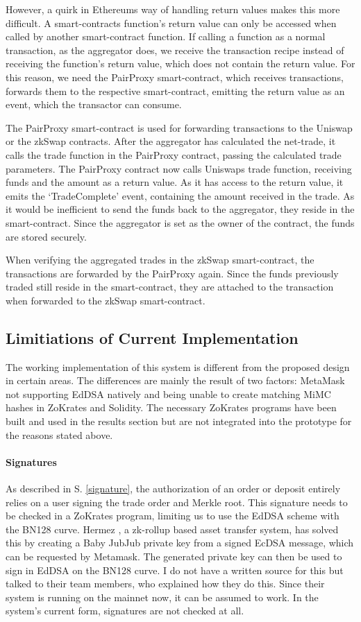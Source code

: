 \documentclass[../../thesis.tex]{subfiles}
\begin{document}
However, a quirk in Ethereums way of handling return values makes this more difficult. A smart-contracts function's return value can only be accessed when called by another smart-contract function. If calling a function as a normal transaction, as the aggregator does, we receive the transaction recipe instead of receiving the function's return value, which does not contain the return value. For this reason, we need the PairProxy smart-contract, which receives transactions, forwards them to the respective smart-contract, emitting the return value as an event, which the transactor can consume. 

The PairProxy smart-contract is used for forwarding transactions to the Uniswap or the zkSwap contracts. After the aggregator has calculated the net-trade, it calls the trade function in the PairProxy contract, passing the calculated trade parameters. The PairProxy contract now calls Uniswaps trade function, receiving funds and the amount as a return value. As it has access to the return value, it emits the `TradeComplete' event, containing the amount received in the trade. As it would be inefficient to send the funds back to the aggregator, they reside in the smart-contract. Since the aggregator is set as the owner of the contract, the funds are stored securely.

When verifying the aggregated trades in the zkSwap smart-contract, the transactions are forwarded by the PairProxy again. Since the funds previously traded still reside in the smart-contract, they are attached to the transaction when forwarded to the zkSwap smart-contract.

\subsection{Limitiations of Current Implementation}
The working implementation of this system is different from the proposed design in certain areas. The differences are mainly the result of two factors: MetaMask not supporting EdDSA natively and being unable to create matching MiMC hashes in ZoKrates and Solidity. The necessary ZoKrates programs have been built and used in the results section but are not integrated into the prototype for the reasons stated above. 

\paragraph{Signatures}
As described in S. \ref{signature}, the authorization of an order or deposit entirely relies on a user signing the trade order and Merkle root. This signature needs to be checked in a ZoKrates program, limiting us to use the EdDSA scheme with the BN128 curve. Hermez \cite{hermez_docs}, a zk-rollup based asset transfer system, has solved this by creating a Baby JubJub\cite{baylinaeddsa} private key from a signed EcDSA message, which can be requested by Metamask. The generated private key can then be used to sign in EdDSA on the BN128 curve. I do not have a written source for this but talked to their team members, who explained how they do this. Since their system is running on the mainnet now, it can be assumed to work. In the system's current form, signatures are not checked at all.
\end{document}
